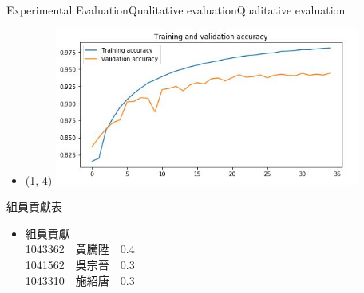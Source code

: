 \documentclass{beamer}
\begin{document}
\begin{CJK}{UTF8}{}
\begin{frame}{Experimental Evaluation}{Qualitative evaluationQualitative evaluation}
	\begin{itemize}
	\item{
		\begin{textblock}{3}(1,-4)
		\includegraphics[width=10cm]{accuracy.jpg}
		\end{textblock}
	}	
	\end{itemize}
\end{frame}

\begin{frame}{組員貢獻表}
	\begin{itemize}
	\item{
		組員貢獻\\
		1043362　黃騰陞　0.4\\
		1041562　吳宗晉　0.3\\
		1043310　施紹唐　0.3\\
	}	
	\end{itemize}
\end{frame}

\end{CJK}
\end{document}
